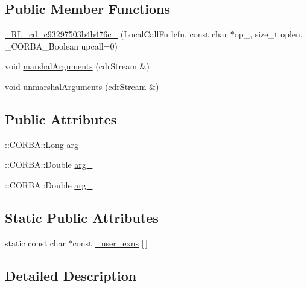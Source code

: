 \subsection*{Public Member Functions}
\begin{DoxyCompactItemize}
\item 
\hyperlink{class__0_r_l__cd__c93297503b4b476c__50000000_a0969c7fefe88982e32a15b255cbd6444}{\+\_\+R\+L\+\_\+cd\+\_\+c93297503b4b476c\+\_} (Local\+Call\+Fn lcfn, const char $\ast$op\+\_\+, size\+\_\+t oplen, \+\_\+\+C\+O\+R\+B\+A\+\_\+\+Boolean upcall=0)
\item 
void \hyperlink{class__0_r_l__cd__c93297503b4b476c__50000000_a555f809315838ca64716c409ff1cc821}{marshal\+Arguments} (cdr\+Stream \&)
\item 
void \hyperlink{class__0_r_l__cd__c93297503b4b476c__50000000_a81eb249414388136f92fd9f584475a77}{unmarshal\+Arguments} (cdr\+Stream \&)
\end{DoxyCompactItemize}
\subsection*{Public Attributes}
\begin{DoxyCompactItemize}
\item 
\+::C\+O\+R\+B\+A\+::\+Long \hyperlink{class__0_r_l__cd__c93297503b4b476c__50000000_adf874b79561a94362612a9a66efe8367}{arg\+\_}
\item 
\+::C\+O\+R\+B\+A\+::\+Double \hyperlink{class__0_r_l__cd__c93297503b4b476c__50000000_a47d6cd5ebcdbf217e29a25baba671df8}{arg\+\_}
\item 
\+::C\+O\+R\+B\+A\+::\+Double \hyperlink{class__0_r_l__cd__c93297503b4b476c__50000000_a6db84fccb3f773ae9dcf309b0b7e3682}{arg\+\_}
\end{DoxyCompactItemize}
\subsection*{Static Public Attributes}
\begin{DoxyCompactItemize}
\item 
static const char $\ast$const \hyperlink{class__0_r_l__cd__c93297503b4b476c__50000000_ab515d885d1083c80fcaf70a6878e41e6}{\+\_\+user\+\_\+exns} \mbox{[}$\,$\mbox{]}
\end{DoxyCompactItemize}


\subsection{Detailed Description}


